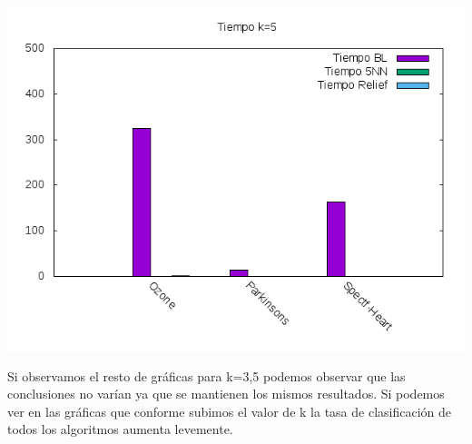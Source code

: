 \documentclass[12pt,a4paper]{article}
\begin{document}
	\newline
	\includegraphics*[scale=1]{./Imagenes/K5/tiempo.png}
	
	Si observamos el resto de gráficas para k=3,5 podemos observar que las conclusiones no varían ya que se mantienen los mismos resultados. Si podemos ver en las gráficas que conforme subimos el valor de k la tasa de clasificación de todos los algoritmos aumenta levemente. 
\end{document}
